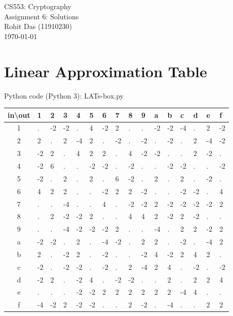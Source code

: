 \documentclass[12pt]{article}
\begin{document}
\begin{titlepage}
\centering
\vspace*{\fill}
\huge CS553: Cryptography\\
\LARGE Assignment 6: Solutions\\
\Large Rohit Das (11910230)\\\vspace{0.8cm}
\today
\vspace*{\fill}
\end{titlepage}

\section{Linear Approximation Table}

\begin{large}
Python code (Python 3): LAT\textunderscore s-box.py


\vspace{0.05cm}

\begin{center}

\begin{tabular}{c||*{15}{p{0.5cm}}}

in\textbackslash out & 1 & 2 & 3 & 4 & 5 & 6 & 7 & 8 & 9 & a & b & c & d & e & f\\\hline
1 &  .&-2&-2& .& 4&-2& 2& .& .&-2&-2&-4& .& 2&-2\\
2 &  2& .& 2&-4& 2& .&-2& .&-2& .&-2& .& 2&-4&-2\\
3 & -2& 2& .& 4& 2& 2& .& 4&-2&-2& .& .& 2&-2& .\\
4 & -2&\cellcolor[rgb]{0.96,0.37,0.37}6& .& .&-2&-2& .&-2& .& .&-2&-2& .& .&-2\\
5 & -2& .& 2& .& 2& .&\cellcolor[rgb]{0.96,0.37,0.37}6&-2& .& 2& .& 2& .&-2& .\\
6 &  4& 2& 2& .& .&-2& 2& 2&-2& .& .&-2&-2& .& 4\\
7 &  .& .&-4& .& .& 4& .&-2&-2& 2&-2&-2&-2&-2& 2\\
8 &  .& 2&-2&-2& 2& .& .& 4& 4& 2&-2& 2&-2& .& .\\
9 &  .& .&-4&-2&-2&-2& 2& .& .&-4& .& 2& 2&-2& 2\\
a & -2&-2& .& 2& .&-4&-2& .& 2& 2& .&-2& .&-4& 2\\
b &  2& .&-2& 2& .&-2& .& .&-2& 4&-2& 2& 4& 2& .\\
c & -2& .&-2&-2& .&-2& .& 2&-4& 2& 4& .&-2& .&-2\\
d & -2& 2& .&-2& 4& .&-2&-2& .& .& 2& .& 2& 2& 4\\
e &  .& .& .&-2&-2& 2& 2& 2& 2& 2& 2&-4& 4& .& .\\
f & -4&-2& 2&-2&-2& .& .& 2&-2& .&-4& .& .& 2& 2\\


\end{tabular}
\end{center}
\end{large}
\end{document}
